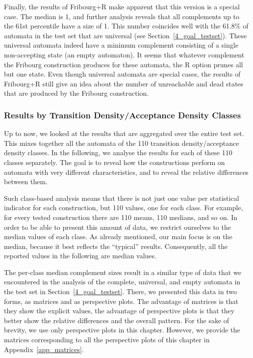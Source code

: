 Finally, the results of Fribourg+R make apparent that this version is a special case. The median is 1, and further analysis reveals that all complements up to the 61st percentile have a size of 1. This number coincides well with the 61.8\% of automata in the \goal{} test set that are universal (see Section~\ref{4_goal_testset}). These universal automata indeed have a minimum complement consisting of a single non-accepting state (an empty automaton). It seems that whatever complement the Fribourg construction produces for these automata, the R option prunes all but one state. Even though universal automata are special cases, the results of Fribourg+R still give an idea about the number of unreachable and dead states that are produced by the Fribourg construction.

\subsubsection{Results by Transition Density/Acceptance Density Classes}
Up to now, we looked at the results that are aggregated over the entire test set. This mixes together all the automata of the 110 transition density/acceptance density classes. In the following, we analyse the results for each of these 110 classes separately. The goal is to reveal how the constructions perform on automata with very different characteristics, and to reveal the relative differences between them.

Such class-based analysis means that there is not just one value per statistical indicator for each construction, but 110 values, one for each class. For example, for every tested construction there are 110 means, 110 medians, and so on. In order to be able to present this amount of data, we restrict ourselves to the median values of each class. As already mentioned, our main focus is on the median, because it best reflects the ``typical'' results. Consequently, all the reported values in the following are median values. 

The per-class median complement sizes result in a similar type of data that we encountered in the analysis of the complete, universal, and empty automata in the \goal{} test set in Section~\ref{4_goal_testset}. There, we presented this data in two forms, as matrices and as perspective plots. The advantage of matrices is that they show the explicit values, the advantage of perspective plots is that they better show the relative differences and the overall pattern. For the sake of brevity, we use only perspective plots in this chapter. However, we provide the matrices corresponding to all the perspective plots of this chapter in Appendix~\ref{app_matrices}.

